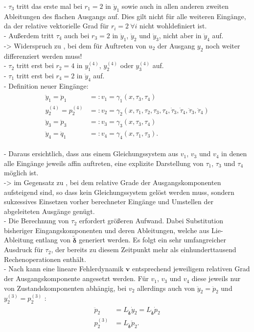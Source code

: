 - $\tau_3$ tritt das erste mal bei $r_1 = 2$ in $\ddot{y}_1$ sowie auch in allen anderen zweiten Ableitungen des flachen Ausgangs auf. Dies gilt nicht für alle weiteren Eingänge, da der relative vektorielle Grad für $r_i = 2 \ \forall i$ nicht wohldefiniert ist. \\
- Außerdem tritt $\tau_4$ auch bei $r_3 = 2$ in $\ddot{y}_1$, $\ddot{y}_2$ und $\ddot{y}_3$, nicht aber in $\ddot{y}_4$ auf. \\
-> Widerspruch zu \cite[S. 206]{NLRT_Roebenack}, bei dem für Auftreten von  $u_2$ der Ausgang $y_2$ noch weiter differenziert werden muss! \\ 
- $\tau_2$ tritt erst bei $r_2 = 4$ in $y_1^{(4)}$, $y_2^{(4)}$ oder $y_3^{(4)}$ auf. \\
- $\tau_1$ tritt erst bei $r_4 = 2$ in $\ddot{y}_4$ auf. \\
- Definition neuer Eingänge:
\begin{align}
\begin{split}
	\ddot{y}_1 = \ddot{p}_1 &=: v_1 = \gamma_1(x, \tau_3, \tau_4) \\
	y_2^{(4)} = p_2^{(4)} &=: v_2 = \gamma_2(x, \tau_1, \tau_2, \tau_3, \tau_4, \dot{\tau}_3, \dot{\tau}_4, \ddot{\tau}_3, \ddot{\tau}_4) \\
	\ddot{y}_3 = \ddot{p}_3 &=: v_3 = \gamma_3(x, \tau_3, \tau_4) \\
	\ddot{y}_4 = \ddot{q}_1 &=: v_4 = \gamma_4(x, \tau_1, \tau_3) .
\end{split}
\end{align}

- Daraus ersichtlich, dass aus einem Gleichungssystem aus $v_1$, $v_3$ und $v_4$ in denen alle Eingänge jeweils affin auftreten, eine explizite Darstellung von $\tau_1$, $\tau_3$ und $\tau_4$ möglich ist. \\
-> im Gegensatz zu \cite[S. 207]{NLRT_Roebenack}, bei dem relative Grade der Ausgangskomponenten aufsteigend sind, so dass kein Gleichungssystem gelöst werden muss, sondern sukzessives Einsetzen vorher berechneter Eingänge und Umstellen der abgeleiteten Ausgänge genügt.\\
- Die Berechnung von $\tau_2$ erfordert größeren Aufwand. Dabei Substitution bisheriger Eingangskomponenten und deren Ableitungen, welche aus Lie-Ableitung entlang von $\pmb{\tilde{\delta}}$ generiert werden. Es folgt ein sehr umfangreicher Ausdruck für $\tau_2$, der bereits zu diesem Zeitpunkt mehr als einhunderttausend Rechenoperationen enthält. \\
- Nach \cite[S. 208]{NLRT_Roebenack} kann eine lineare Fehlerdynamik $\pmb{v}$ entsprechend jeweiligem relativen Grad der Ausgangskomponente angesetzt werden. Für $v_1$, $v_3$ und $v_4$ diese jeweils nur von Zustandskomponenten abhängig, bei $v_2$ allerdings auch von $\ddot{y}_2 = \ddot{p}_2$ und $y_2^{(3)} = p_2^{(3)}$ :
\begin{align}
	\begin{split}
		\ddot{p}_2 &= L_{\pmb{\tilde{\delta}}} \dot{y}_2 = L_{\pmb{\tilde{\delta}}} \dot{p}_2 \\
		p_2^{(3)} &= L_{\pmb{\tilde{\delta}}} \ddot{p}_2.
	\end{split}
\end{align}

